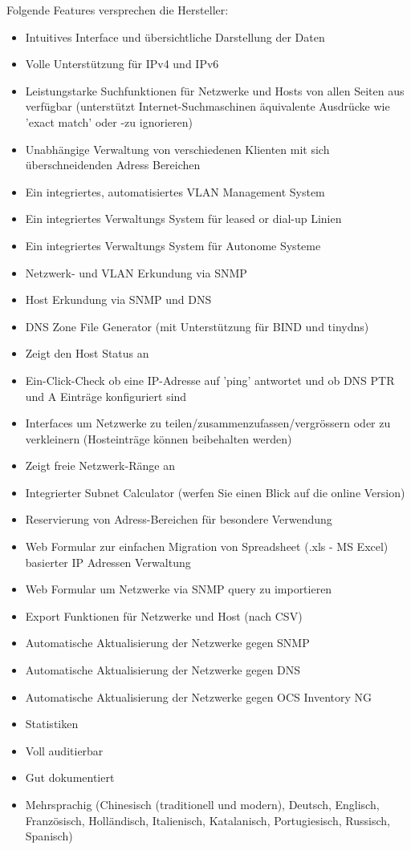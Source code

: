 \documentclass[11pt,a4paper,parskip=half]{scrartcl}
\begin{document}
Folgende Features versprechen die Hersteller:
\begin{itemize}
\item{Intuitives Interface und übersichtliche Darstellung der Daten}
\item{Volle Unterstützung für IPv4 und IPv6}
\item{Leistungstarke Suchfunktionen für Netzwerke und Hosts von allen Seiten aus verfügbar (unterstützt Internet-Suchmaschinen äquivalente Ausdrücke wie 'exact match' oder -zu ignorieren)}
\item{Unabhängige Verwaltung von verschiedenen Klienten mit sich überschneidenden Adress Bereichen}
\item{Ein integriertes, automatisiertes VLAN Management System}
\item{Ein integriertes Verwaltungs System für leased or dial-up Linien}
\item{Ein integriertes Verwaltungs System für Autonome Systeme}
\item{Netzwerk- und VLAN Erkundung via SNMP}
\item{Host Erkundung via SNMP und DNS}
\item{DNS Zone File Generator (mit Unterstützung für BIND und tinydns)}
\item{Zeigt den Host Status an}
\item{Ein-Click-Check ob eine IP-Adresse auf 'ping' antwortet und ob DNS PTR und A Einträge konfiguriert sind}
\item{Interfaces um Netzwerke zu teilen/zusammenzufassen/vergrössern oder zu verkleinern (Hosteinträge können beibehalten werden)}
\item{Zeigt freie Netzwerk-Ränge an}
\item{Integrierter Subnet Calculator (werfen Sie einen Blick auf die online Version)}
\item{Reservierung von Adress-Bereichen für besondere Verwendung}
\item{Web Formular zur einfachen Migration von Spreadsheet (.xls - MS Excel) basierter IP Adressen Verwaltung}
\item{Web Formular um Netzwerke via SNMP query zu importieren}
\item{Export Funktionen für Netzwerke und Host (nach CSV)}
\item{Automatische Aktualisierung der Netzwerke gegen SNMP}
\item{Automatische Aktualisierung der Netzwerke gegen DNS}
\item{Automatische Aktualisierung der Netzwerke gegen OCS Inventory NG}
\item{Statistiken}
\item{Voll auditierbar}
\item{Gut dokumentiert}
\item{Mehrsprachig (Chinesisch (traditionell und modern), Deutsch, Englisch, Französisch, Holländisch, Italienisch, Katalanisch, Portugiesisch, Russisch, Spanisch)}
\end{itemize}
\end{document}

